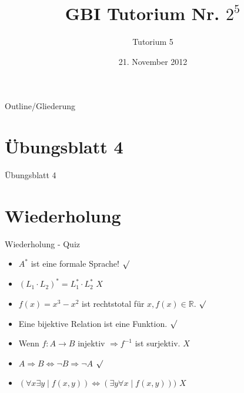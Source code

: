 

\title[Tutorium 5]{GBI Tutorium Nr. $2^5$}
\subtitle{Tutorium 5}
\date{21. November 2012}






	\begin{frame}
		\titlepage
	\end{frame}

	\begin{frame}{Outline/Gliederung}
		\tableofcontents
	\end{frame}
	
	
	\section{\"Ubungsblatt 4}
	\begin{frame} {Übungsblatt 4}
		
	\end{frame}	
		
	
	
	
	\section{Wiederholung} 
	\begin{frame} {Wiederholung - Quiz}
		\begin{itemize}
			\item $A^*$ ist eine formale Sprache! 
			\only<2-> {\color{darkgreen}$\surd$}\\
			\color{black}
			\item $(L_1 \cdot L_2)^* = L_1^* \cdot L_2^*$
			\only<3-> {\color{red}$X$}\\
			\color{black}
			\item $f(x) = x^3-x^2$ ist rechtstotal für $x, f(x) \in \mathbb{R}$.
			\only<4-> {\color{darkgreen}$\surd$}\\
			\color{black}
			\item Eine bijektive Relation ist eine Funktion.
			\only<5-> {\color{darkgreen}$\surd$}\\
			\color{black}
			\item Wenn $f: A \rightarrow B$ injektiv $\Rightarrow f^{-1}$ ist surjektiv.
			\only<6-> {\color{red}$X$}\\
			\color{black}
			\item $A\Rightarrow B \Leftrightarrow \neg B \Rightarrow \neg A$
			\only<7-> {\color{darkgreen}$\surd$}\\
			\color{black}
			\item $(\forall x \exists y \; | \; f(x,y)) \Leftrightarrow (\exists y \forall x \; | \; f(x,y)))$
			\only<8-> {\color{red}$X$}\\
		\end{itemize}
	\end{frame}
	
